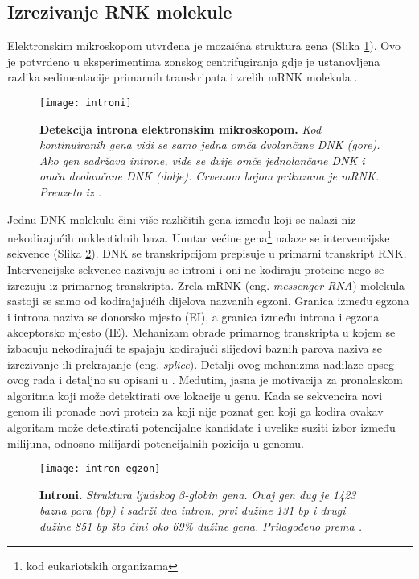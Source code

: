 \subsection{Izrezivanje RNK molekule}
Elektronskim mikroskopom utvrđena je mozaična struktura gena (Slika \ref{fig:intron}). Ovo je potvrđeno u eksperimentima zonskog centrifugiranja gdje je ustanovljena razlika sedimentacije primarnih transkripata i zrelih mRNK molekula \cite{Berg01}.
\begin{center}
   \begin{figure}[ht!]
      \begin{center}
         \texttt{[image: introni]}
                 \caption[Detekcija introna elektronskim mikroskopom]{\textbf{Detekcija introna elektronskim mikroskopom.} \textit{Kod kontinuiranih gena vidi se samo jedna omča dvolančane DNK (gore). Ako gen sadržava introne, vide se dvije omče jednolančane DNK i omča dvolančane DNK (dolje). Crvenom bojom prikazana je mRNK. Preuzeto iz \cite{Berg01}.}}
         \label{fig:intron}
      \end{center}
   \end{figure}
\end{center}
Jednu DNK molekulu čini više različitih gena između koji se nalazi niz nekodirajućih nukleotidnih baza. Unutar većine gena\footnote{kod eukariotskih organizama} nalaze se intervencijske sekvence (Slika \ref{fig:gene}). DNK se transkripcijom prepisuje u primarni transkript RNK. Intervencijske sekvence nazivaju se introni i oni ne kodiraju proteine nego se izrezuju iz primarnog transkripta. Zrela mRNK (eng. \textit{messenger RNA}) molekula sastoji se samo od kodirajajućih dijelova nazvanih egzoni.
Granica između egzona i introna naziva se donorsko mjesto (EI), a granica između introna i egzona akceptorsko mjesto (IE). Mehanizam obrade primarnog transkripta u kojem se izbacuju nekodirajući te spajaju kodirajući slijedovi baznih parova naziva se izrezivanje ili prekrajanje (eng. \textit{splice}). Detalji ovog mehanizma nadilaze opseg ovog rada i detaljno su opisani u \cite{Brown01, Cox01}. Međutim, jasna je motivacija za pronalaskom algoritma koji može detektirati ove lokacije u genu. Kada se sekvencira novi genom ili pronađe novi protein za koji nije poznat gen koji ga kodira ovakav algoritam može detektirati potencijalne kandidate i uvelike suziti izbor između milijuna, odnosno milijardi potencijalnih pozicija u genomu.
\begin{center}
   \begin{figure}[t!]
      \begin{center}
         \texttt{[image: intron\_egzon]}
                 \caption[Introni]{\textbf{Introni.} \textit{Struktura ljudskog $\beta$-globin gena. Ovaj gen dug je 1423 bazna para (bp) i sadrži dva intron, prvi dužine 131 bp i drugi dužine 851 bp što čini oko 69\% dužine gena. Prilagođeno prema \cite{Brown01}.}}
         \label{fig:gene}
      \end{center}
   \end{figure}
\end{center}
